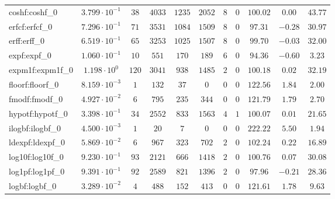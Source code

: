 \begin{tabular}{|l|c|c|c|c|c|c|c|c|c|c|}
coshf:coshf\_0               & $ 3.799 \cdot 10^{-1} $ & $ 38     $ & $ 4033  $ & $ 1235  $ & $ 2052  $ & $ 8   $ & $ 0 $ & $ 100.02      $ & $ 0.00    $ & $ 43.77   $ \\
erfcf:erfcf\_0               & $ 7.296 \cdot 10^{-1} $ & $ 71     $ & $ 3531  $ & $ 1084  $ & $ 1509  $ & $ 8   $ & $ 0 $ & $ 97.31       $ & $ -0.28   $ & $ 30.97   $ \\
erff:erff\_0                 & $ 6.519 \cdot 10^{-1} $ & $ 65     $ & $ 3253  $ & $ 1025  $ & $ 1507  $ & $ 8   $ & $ 0 $ & $ 99.70       $ & $ -0.03   $ & $ 32.00   $ \\
expf:expf\_0                 & $ 1.060 \cdot 10^{-1} $ & $ 10     $ & $ 551   $ & $ 170   $ & $ 189   $ & $ 6   $ & $ 0 $ & $ 94.36       $ & $ -0.60   $ & $ 3.23    $ \\
expm1f:expm1f\_0             & $ 1.198 \cdot 10^{0}  $ & $ 120    $ & $ 3041  $ & $ 938   $ & $ 1485  $ & $ 2   $ & $ 0 $ & $ 100.18      $ & $ 0.02    $ & $ 32.19   $ \\
floorf:floorf\_0             & $ 8.159 \cdot 10^{-3} $ & $ 1      $ & $ 132   $ & $ 37    $ & $ 0     $ & $ 0   $ & $ 0 $ & $ 122.56      $ & $ 1.84    $ & $ 2.00    $ \\
fmodf:fmodf\_0               & $ 4.927 \cdot 10^{-2} $ & $ 6      $ & $ 795   $ & $ 235   $ & $ 344   $ & $ 0   $ & $ 0 $ & $ 121.79      $ & $ 1.79    $ & $ 2.70    $ \\
hypotf:hypotf\_0             & $ 3.398 \cdot 10^{-1} $ & $ 34     $ & $ 2552  $ & $ 833   $ & $ 1563  $ & $ 4   $ & $ 1 $ & $ 100.07      $ & $ 0.01    $ & $ 21.65   $ \\
ilogbf:ilogbf\_0             & $ 4.500 \cdot 10^{-3} $ & $ 1      $ & $ 20    $ & $ 7     $ & $ 0     $ & $ 0   $ & $ 0 $ & $ 222.22      $ & $ 5.50    $ & $ 1.94    $ \\
ldexpf:ldexpf\_0             & $ 5.869 \cdot 10^{-2} $ & $ 6      $ & $ 967   $ & $ 323   $ & $ 702   $ & $ 2   $ & $ 0 $ & $ 102.24      $ & $ 0.22    $ & $ 16.89   $ \\
log10f:log10f\_0             & $ 9.230 \cdot 10^{-1} $ & $ 93     $ & $ 2121  $ & $ 666   $ & $ 1418  $ & $ 2   $ & $ 0 $ & $ 100.76      $ & $ 0.07    $ & $ 30.08   $ \\
log1pf:log1pf\_0             & $ 9.391 \cdot 10^{-1} $ & $ 92     $ & $ 2589  $ & $ 821   $ & $ 1396  $ & $ 2   $ & $ 0 $ & $ 97.96       $ & $ -0.21   $ & $ 28.36   $ \\
logbf:logbf\_0               & $ 3.289 \cdot 10^{-2} $ & $ 4      $ & $ 488   $ & $ 152   $ & $ 413   $ & $ 0   $ & $ 0 $ & $ 121.61      $ & $ 1.78    $ & $ 9.63    $ \\

\end{tabular}
